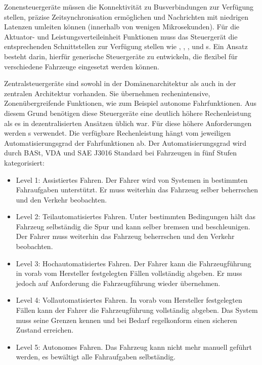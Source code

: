 Zonensteuergeräte müssen die Konnektivität zu Busverbindungen zur Verfügung stellen, präzise Zeitsynchronisation ermöglichen und Nachrichten mit niedrigen Latenzen umleiten können (innerhalb von wenigen Mikrosekunden). Für die Aktuator- und Leistungsverteileinheit Funktionen muss das Steuergerät die entsprechenden Schnittstellen zur Verfügung stellen wie , , ,  und s. Ein Ansatz besteht darin, hierfür generische Steuergeräte zu entwickeln, die flexibel für verschiedene Fahrzeuge eingesetzt werden können. \cite{Maier2023}

Zentralsteuergeräte sind sowohl in der Domänenarchitektur als auch in der zentralen Architektur vorhanden. Sie übernehmen rechenintensive, Zonenübergreifende Funktionen, wie zum Beispiel autonome Fahrfunktionen. Aus diesem Grund benötigen diese Steuergeräte eine deutlich höhere Rechenleistung als es in dezentralisierten Ansätzen üblich war. Für diese höhere Anforderungen werden s verwendet. Die verfügbare Rechenleistung hängt vom jeweiligen Automatisierungsgrad der Fahrfunktionen ab. Der Automatisierungsgrad wird durch BASt, VDA und SAE J3016 Standard bei Fahrzeugen in fünf Stufen kategorisiert:

\begin{itemize}
	\item Level 1: Assistiertes Fahren. Der Fahrer wird von Systemen in bestimmten Fahraufgaben unterstützt. Er muss weiterhin das Fahrzeug selber beherrschen und den Verkehr beobachten.
	\item Level 2: Teilautomatisiertes Fahren. Unter bestimmten Bedingungen hält das Fahrzeug selbständig die Spur und kann selber bremsen und beschleunigen. Der Fahrer muss weiterhin das Fahrzeug beherrschen und den Verkehr beobachten. 
	\item Level 3: Hochautomatisiertes Fahren. Der Fahrer kann die Fahrzeugführung in vorab vom Hersteller festgelegten Fällen vollständig abgeben. Er muss jedoch auf Anforderung die Fahrzeugführung wieder übernehmen.
	\item Level 4: Vollautomatisiertes Fahren. In vorab vom Hersteller festgelegten Fällen kann der Fahrer die Fahrzeugführung vollständig abgeben. Das System muss seine Grenzen kennen und bei Bedarf regelkonform einen sicheren Zustand erreichen.
	\item Level 5: Autonomes Fahren. Das Fahrzeug kann nicht mehr manuell geführt werden, es bewältigt alle Fahraufgaben selbständig.
\end{itemize} \cite{SAEinternational}

